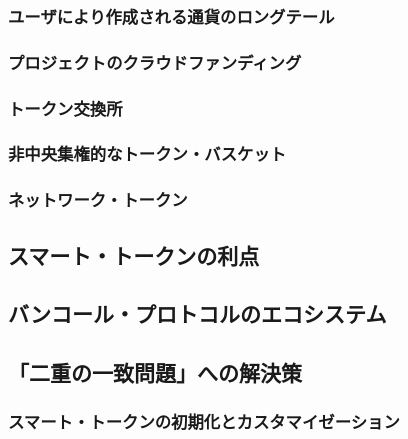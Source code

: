 \documentclass{jsarticle}
\begin{document}
    \subsubsection{ユーザにより作成される通貨のロングテール}



    \subsubsection{プロジェクトのクラウドファンディング}



    \subsubsection{トークン交換所}



    \subsubsection{非中央集権的なトークン・バスケット}



    \subsubsection{ネットワーク・トークン}



  \subsection{スマート・トークンの利点}



  \subsection{バンコール・プロトコルのエコシステム}



  \subsection{「二重の一致問題」への解決策}



    \subsubsection{スマート・トークンの初期化とカスタマイゼーション}
\end{document}
